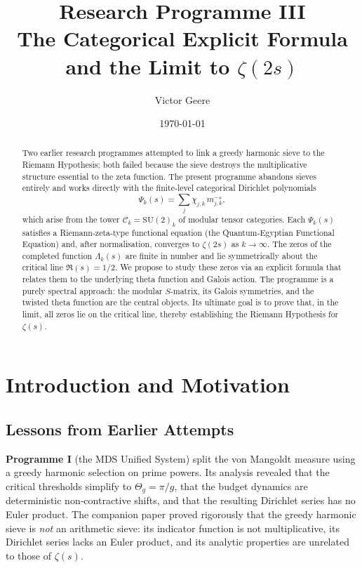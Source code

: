 \documentclass[11pt,a4paper]{article}
\title{\bfseries Research Programme III\\[4pt]
\large The Categorical Explicit Formula and the Limit to \(\zeta(2s)\)}
\author{Victor Geere}
\date{\today}
\theoremstyle{remark}
\begin{document}
\maketitle

\begin{abstract}
Two earlier research programmes attempted to link a greedy harmonic sieve to the Riemann Hypothesis; both failed because the sieve destroys the multiplicative structure essential to the zeta function.
The present programme abandons sieves entirely and works directly with the finite‑level categorical Dirichlet polynomials
\[
\Psi_k(s)=\sum_{j}\chi_{j,k}\,m_{j,k}^{-s},
\]
which arise from the tower \(\mathcal{C}_k=\mathrm{SU}(2)_k\) of modular tensor categories.
Each \(\Psi_k(s)\) satisfies a Riemann‑zeta‑type functional equation (the Quantum‑Egyptian Functional Equation) and, after normalisation, converges to \(\zeta(2s)\) as \(k\to\infty\).
The zeros of the completed function \(\Lambda_k(s)\) are finite in number and lie symmetrically about the critical line \(\Re(s)=1/2\).
We propose to study these zeros via an explicit formula that relates them to the underlying theta function and Galois action.
The programme is a purely spectral approach: the modular \(S\)-matrix, its Galois symmetries, and the twisted theta function are the central objects.
Its ultimate goal is to prove that, in the limit, all zeros lie on the critical line, thereby establishing the Riemann Hypothesis for \(\zeta(s)\).
\end{abstract}

\section{Introduction and Motivation}

\subsection{Lessons from Earlier Attempts}

\textbf{Programme I} (the MDS Unified System) split the von Mangoldt measure using a greedy harmonic selection on prime powers.
Its analysis revealed that the critical thresholds simplify to \(\Theta_g=\pi/g\), that the budget dynamics are deterministic non‑contractive shifts, and that the resulting Dirichlet series has no Euler product.
The companion paper \cite{greedy-sieve} proved rigorously that the greedy harmonic sieve is \emph{not} an arithmetic sieve: its indicator function is not multiplicative, its Dirichlet series lacks an Euler product, and its analytic properties are unrelated to those of \(\zeta(s)\).
\end{document}
